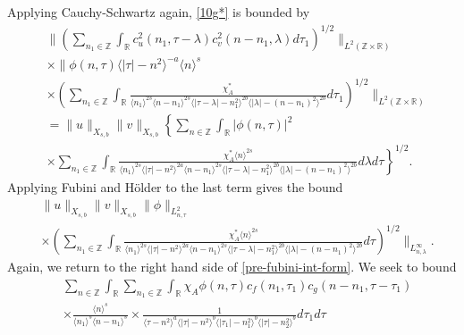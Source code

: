 \documentclass[12pt,reqno]{amsart}
\numberwithin{equation}{section}  %
\numberwithin{figure}{section}
\newcommand{\rr}{\mathbb{R}}
\newcommand{\zz}{\mathbb{Z}}
\theoremstyle{plain}
\theoremstyle{definition}
\theoremstyle{remark}
\begin{document}
%
Applying Cauchy-Schwartz again, \eqref{10g*} is bounded by
%
%
\begin{equation*}
  \begin{split}
  & \|\left( \sum_{n_{1} \in \zz }\int_{\rr } c_{u}^{2}(n_1, \tau - \lambda)
  c_{v}^{2} (n - n_1, \lambda ) d \tau_1  \right)^{1/2} \|_{L^{2}(\zz \times
		\rr)}
		\\
    & \times  \|\phi(n, \tau) \langle | \tau | - n^{2} \rangle ^{-a} \langle n
    \rangle ^{s}
		\\
    & \times \left( \sum_{n_{1} \in \zz} \int_{\rr} \frac{\chi^{*}_{A}}{ \langle n_{1}
    \rangle ^{2s} \langle n-n_{1} \rangle ^{2s} \langle | \tau - \lambda|-n_{1}^{2}
    \rangle^{2b} \langle  |\lambda | -(n - n_{1})^{2}
    \rangle^{2b} } d \tau_1 \right)^{1/2} \|_{L^2(\zz \times \rr)}
		\\
    & = \|u\|_{X_{s,b}} \|v\|_{X_{s,b}} \label{holder-term*}
    \left \{ \sum_{n \in \zz} \int_{\rr} |\phi(n, \tau)|^{2} \right .
    \\
    & \left. \times \sum_{n_{1} \in \zz} \int_{\rr} \frac{\chi^{*}_{A}
    \langle n \rangle ^{2s}
    }{ \langle n_{1} \rangle^{2s} \langle | \tau | - n^{2}
    \rangle ^{2a}  \langle
n-n_{1} \rangle ^{2s}  \langle | \tau - \lambda|-n_{1}^{2}
\rangle^{2b} \langle  | \lambda | -(n - n_{1})^{2}
    \rangle^{2b} } d \lambda d \tau \right \}^{1/2}.
  \end{split}
\end{equation*}
%
%
Applying Fubini and H{\"o}lder to the last term gives the bound
%
%
\begin{equation}
  \label{integral-bound-1st-form-per*}
	\begin{split}
    & \|u\|_{X_{s,b}} \|v\|_{X_{s,b}} \| \phi \|_{L^{2}_{n, \tau}}
    \\
    & \times \left( \sum_{n_{1} \in \zz} \int_{\rr} \frac{\chi^{*}_{A}
    \langle n \rangle ^{2s}
    }{ \langle n_{1} \rangle^{2s} \langle | \tau | - n^{2}
    \rangle ^{2a}  \langle
n-n_{1} \rangle ^{2s}  \langle | \tau - \lambda|-n_{1}^{2}
\rangle^{2b} \langle  | \lambda | -(n - n_{1})^{2}
    \rangle^{2b} } d \tau  \right)^{1/2} \|_{L^\infty_{n, \lambda}}.
	\end{split}
\end{equation}
Again, we return to the right hand side of \eqref{pre-fubini-int-form}.
We seek to bound
\begin{equation*}
\begin{split}
  & \sum_{n \in \zz} \int_{\rr}  \sum_{n_{1} \in \zz }
  \int_{\rr} \chi_{A} \phi(n, \tau)
    c_f(n_1, \tau_1)
		c_g(n - n_1, \tau - \tau_1 )
		\\
    & \times \frac{\langle n \rangle ^{s}}{\langle n_{1} \rangle ^{s} \langle
    n-n_{1} \rangle ^{s}} \times \frac{1}{ \langle \tau - n^{2} \rangle^{a}
\langle |\tau| - n^{2} \rangle
    ^{b}\langle |\tau_{1}|-n_{1}^{2} \rangle ^{b}\langle | \tau|-n_{2}^{2}
    \rangle ^{b}} d \tau_1 d \tau 
   \end{split}
\end{equation*}
\end{document}
